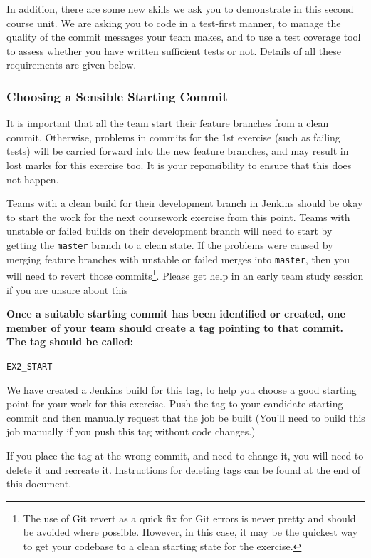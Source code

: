 \documentclass[
]{book}
\begin{document}
In addition, there are some new skills we ask you to demonstrate in this second course unit. We are asking you to code in a test-first manner, to manage the quality of the commit messages your team makes, and to use a test coverage tool to assess whether you have written sufficient tests or not. Details of all these requirements are given below.

\hypertarget{sensible}{%
\subsubsection*{Choosing a Sensible Starting Commit}\label{sensible}}

It is important that all the team start their feature branches from a clean commit. Otherwise, problems in commits for the 1st exercise (such as failing tests) will be carried forward into the new feature branches, and may result in lost marks for this exercise too. It is your reponsibility to ensure that this does not happen.

Teams with a clean build for their development branch in Jenkins should be okay to start the work for the next coursework exercise from this point. Teams with unstable or failed builds on their development branch will need to start by getting the \texttt{master} branch to a clean state. If the problems were caused by merging feature branches with unstable or failed merges into \texttt{master}, then you will need to revert those commits\footnote{The use of Git revert as a quick fix for Git errors is never pretty and should be avoided where possible. However, in this case, it may be the quickest way to get your codebase to a clean starting state for the exercise.}. Please get help in an early team study session if you are unsure about this

\textbf{Once a suitable starting commit has been identified or created, one member of your team should create a tag pointing to that commit. The tag should be called:}

\texttt{EX2\_START}

We have created a Jenkins build for this tag, to help you choose a good starting point for your work for this exercise. Push the tag to your candidate starting commit and then manually request that the job be built (You'll need to build this job manually if you push this tag without code changes.)

If you place the tag at the wrong commit, and need to change it, you will need to delete it and recreate it. Instructions for deleting tags can be found at the end of this document.
\end{document}
